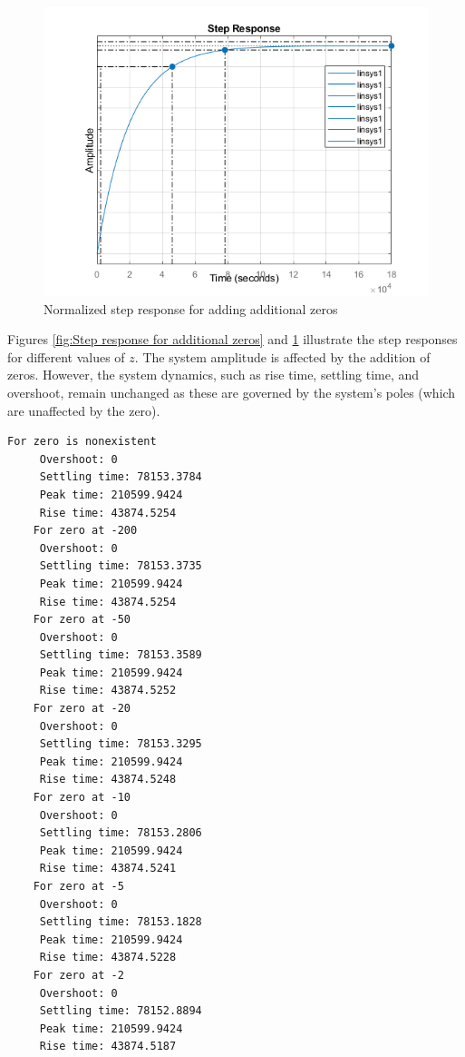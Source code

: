 \documentclass[a4paper, 12pt, english]{article}
\begin{document}
\begin{figure}[H]
    \centering
    \includegraphics[width=0.82\linewidth]{report/images/zeros_step_response_normalized.png}
    \caption{Normalized step response for adding additional zeros}
    \label{fig:normalized step response for additional zeros}
\end{figure}

\noindent
Figures \ref{fig:Step response for additional zeros} and \ref{fig:normalized step response for additional zeros} illustrate the step responses for different values of $z$.  The system amplitude is affected by the addition of zeros. However, the system dynamics, such as rise time, settling time, and overshoot, remain unchanged as these are governed by the system's poles (which are unaffected by the zero). \newline


\newpage

\begin{lstlisting}[style=commandstyle,caption=Command line output]
    For zero is nonexistent
     Overshoot: 0
     Settling time: 78153.3784
     Peak time: 210599.9424
     Rise time: 43874.5254
    For zero at -200
     Overshoot: 0
     Settling time: 78153.3735
     Peak time: 210599.9424
     Rise time: 43874.5254
    For zero at -50
     Overshoot: 0
     Settling time: 78153.3589
     Peak time: 210599.9424
     Rise time: 43874.5252
    For zero at -20
     Overshoot: 0
     Settling time: 78153.3295
     Peak time: 210599.9424
     Rise time: 43874.5248
    For zero at -10
     Overshoot: 0
     Settling time: 78153.2806
     Peak time: 210599.9424
     Rise time: 43874.5241
    For zero at -5
     Overshoot: 0
     Settling time: 78153.1828
     Peak time: 210599.9424
     Rise time: 43874.5228
    For zero at -2
     Overshoot: 0
     Settling time: 78152.8894
     Peak time: 210599.9424
     Rise time: 43874.5187
\end{lstlisting}
\end{document}
